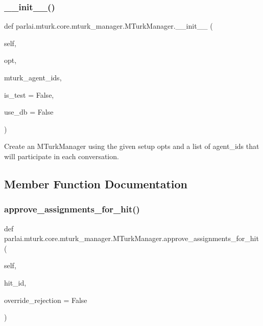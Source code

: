 \subsubsection{\texorpdfstring{\+\_\+\+\_\+init\+\_\+\+\_\+()}{\_\_init\_\_()}}
{\footnotesize\ttfamily def parlai.\+mturk.\+core.\+mturk\+\_\+manager.\+M\+Turk\+Manager.\+\_\+\+\_\+init\+\_\+\+\_\+ (\begin{DoxyParamCaption}\item[{}]{self,  }\item[{}]{opt,  }\item[{}]{mturk\+\_\+agent\+\_\+ids,  }\item[{}]{is\+\_\+test = {\ttfamily False},  }\item[{}]{use\+\_\+db = {\ttfamily False} }\end{DoxyParamCaption})}

\begin{DoxyVerb}Create an MTurkManager using the given setup opts and a list of agent_ids that
will participate in each conversation.
\end{DoxyVerb}
 

\subsection{Member Function Documentation}
\mbox{\label{classparlai_1_1mturk_1_1core_1_1mturk__manager_1_1MTurkManager_a67335e20ae360682d0b5681a7446492e}} 
\subsubsection{\texorpdfstring{approve\+\_\+assignments\+\_\+for\+\_\+hit()}{approve\_assignments\_for\_hit()}}
{\footnotesize\ttfamily def parlai.\+mturk.\+core.\+mturk\+\_\+manager.\+M\+Turk\+Manager.\+approve\+\_\+assignments\+\_\+for\+\_\+hit (\begin{DoxyParamCaption}\item[{}]{self,  }\item[{}]{hit\+\_\+id,  }\item[{}]{override\+\_\+rejection = {\ttfamily False} }\end{DoxyParamCaption})}

